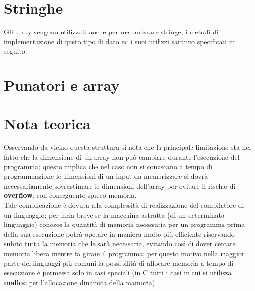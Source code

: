 \section{Stringhe}
Gli array vengono utilizzati anche per memorizzare stringe, i metodi di implementazione di qusto tipo di dato ed i suoi utilizzi saranno specificati in seguito.%
\section{Punatori e array}
 
 
\section{Nota teorica}
Osservando da vicino questa struttura si nota che la principale limitazione sta nel fatto che la dimensione di un array non può cambiare durante l'esecuzione del programma; questo implica che nel caso non si conoscano a tempo di programmazione le dimensioni di un input da memorizzare si dovrà necessariamente sovrastimare le dimensioni dell'array per evitare il rischio di \textbf{overflow}, con conseguente spreco memoria.\\ 
Tale complicazione è dovuta alla complessità di realizzazione del compilatore di un linguaggio: per farla breve se la macchina astratta (di un determinato linguaggio) conosce la quantità di memoria necessaria per un programma prima della sua esecuzione 
potrà operare in maniera molto più efficiente riservando subito tutta la memoria che le sarà necessaria, evitando così di dover cercare memoria libera mentre fa girare il programma; per questo motivo nella maggior parte dei linguaggi più comuni la possibilità di allocare memoria a tempo di esecuzione è permessa solo in casi speciali (in C tutti i casi in cui si utilizza \textbf{malloc} per l'allocazione dinamica della mamoria).\\




